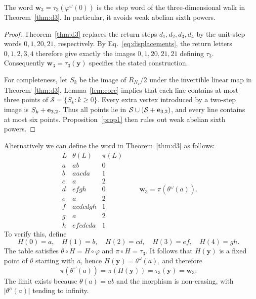 \documentclass[12pt,reqno]{article}
\begin{document}
\begin{corollary}
The word $\mathbf w_3=\tau_3(\varphi^\omega(0))$ is the step word of
the three-dimensional walk in Theorem~\ref{thm:d3}. In particular, it avoids
weak abelian sixth powers.
\end{corollary}

\begin{proof}
Theorem~\ref{thm:d3} replaces the return steps $d_1,d_2,d_3,d_4$ by the unit-step
words $0,1,20,21$, respectively. By Eq.~\eqref{eq:displacements}, the
return letters $0,1,2,3,4$ therefore give exactly the images
$0,1,20,21,21$ defining $\tau_3$. Consequently
$\mathbf w_3=\tau_3(\mathbf y)$ specifies the stated construction.

For completeness, let $S_k$ be the image of $R_{N_k}/2$ under the
invertible linear map in Theorem~\ref{thm:d3}. Lemma~\ref{lem:core} implies that each line
contains at most three points of $\mathcal S=\{S_k:k\geq0\}$.
Every extra vertex introduced by a two-step image is $S_k+{\bf e}_{3,2}$.
Thus all points lie in
$\mathcal S\cup(\mathcal S+{\bf e}_{3,2})$, and every line contains at most
six points. Proposition~\ref{prop1} then rules out weak abelian sixth powers.
\end{proof}

Alternatively we can define the word in Theorem~\ref{thm:d3} as follows:
\begin{equation}\label{eq:eight}
\begin{array}{c|c|c}
 L&\theta(L)&\pi(L)\\ \hline
 a&ab&0\\
 b&aacda&1\\
 c&a&2\\
 d&efgh&0\\
 e&a&2\\
 f&acdcdgh&1\\
 g&a&2\\
 h&efcdcda&1
\end{array}
\qquad
 \mathbf w_3=\pi(\theta^\omega(a)).
\end{equation}
To verify this, define
\[
 H(0)=a,\quad H(1)=b,\quad H(2)=cd,\quad
 H(3)=ef,\quad H(4)=gh.
\]
The table satisfies $\theta \circ  H=H \circ \varphi$ and $\pi\circ H=\tau_3$.
It follows that $H(\mathbf y)$ is a fixed point of $\theta$ starting
with $a$, hence $H(\mathbf y)=\theta^\omega(a)$, and therefore
\[
 \pi(\theta^\omega(a))=\pi(H(\mathbf y))
   =\tau_3(\mathbf y)=\mathbf w_3.
\]
The limit exists because $\theta(a)=ab$ and the morphism is
non-erasing, with $\lvert\theta^n(a)\rvert$ tending to infinity.
\end{document}
